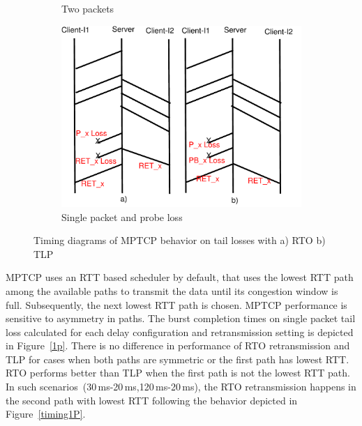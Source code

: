 \documentclass[10pt,conference]{IEEEtran}
\begin{document}
\begin{figure}[!tbp]
\begin{subfigure}[b]{0.32\textwidth}
	\caption{Two packets }\label{timing2P}
 \end{subfigure} 
 \hfill
 \begin{subfigure}[b]{0.32\textwidth}
  	\includegraphics[angle=0, width=\textwidth, natwidth=610, natheight=400]{images/timing1PP.pdf}
	\caption{Single packet and probe loss}\label{timing1PP}
 \end{subfigure}
 \caption{Timing diagrams of MPTCP behavior on tail losses with a) RTO b) TLP }\label{mptiming}	
\end{figure}


MPTCP uses an RTT based scheduler by default, that uses the lowest RTT path among the available paths to transmit
the data until its congestion window is full. Subsequently, the next lowest RTT path is chosen. MPTCP performance
is sensitive to asymmetry in paths. The burst completion times on single packet tail loss calculated for each delay 
configuration and retransmission setting is depicted in Figure~\ref{1p}. There is no difference in performance of RTO retransmission and TLP for 
cases when both paths are symmetric or the first path has lowest RTT. RTO performs better than TLP when the first path is not the lowest RTT path. In such
scenarios~(30\,ms-20\,ms,120\,ms-20\,ms), the RTO retransmission happens in the second path with lowest RTT following the behavior depicted
in Figure~\ref{timing1P}.
\end{document}
